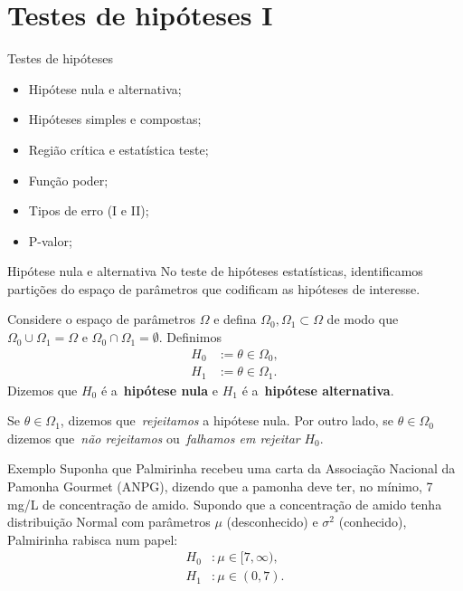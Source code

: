 \section{Testes de hipóteses I}
\begin{frame}{Testes de hipóteses}
 \begin{itemize}
  \item Hipótese nula e alternativa;
  \item Hipóteses simples e compostas;
  \item Região crítica e estatística teste;
  \item Função poder;
  \item Tipos de erro (I e II);
  \item P-valor;
   \end{itemize}
\end{frame}

\begin{frame}{Hipótese nula e alternativa}
 No teste de hipóteses estatísticas, identificamos partições do espaço de parâmetros que codificam as hipóteses de interesse.
 \begin{defn}
 \label{def:hypotheses}
  Considere o espaço de parâmetros $\Omega$ e defina $\Omega_0, \Omega_1 \subset \Omega$ de modo que $\Omega_0 \cup \Omega_1 = \Omega$ e $\Omega_0 \cap \Omega_1 = \emptyset$.
  Definimos
  \begin{align*}
   H_0 &:= \theta \in \Omega_0,\\
   H_1 &:= \theta \in \Omega_1.
  \end{align*}
Dizemos que $H_0$ é a~\textbf{hipótese nula} e $H_1$ é a~\textbf{hipótese alternativa}.

Se $\theta \in \Omega_1$, dizemos que~\textit{rejeitamos} a hipótese nula.
Por outro lado, se $\theta \in \Omega_0$ dizemos que~\textit{não rejeitamos} ou~\textit{falhamos em rejeitar} $H_0$.
 \end{defn}
\end{frame}

\begin{frame}{Exemplo}
Suponha que Palmirinha recebeu uma carta da Associação Nacional da Pamonha Gourmet (ANPG), dizendo que a pamonha deve ter, no mínimo, 7 mg/L de concentração de amido.
Supondo que a concentração de amido tenha distribuição Normal com parâmetros $\mu$ (desconhecido) e $\sigma^2$ (conhecido), Palmirinha rabisca num papel:
  \begin{align*}
   H_0 &:\mu \in [7, \infty),\\
   H_1 &: \mu \in (0, 7).
  \end{align*}
\end{frame}

